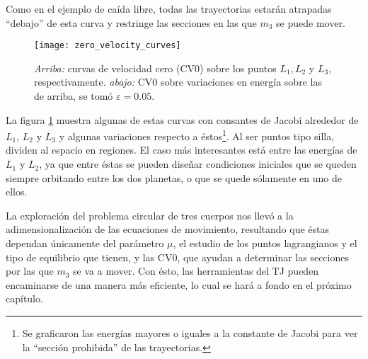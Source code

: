 Como en el ejemplo de caída libre, todas las trayectorias estarán atrapadas ``debajo'' de esta curva y restringe las secciones en las que $m_3$ se puede mover. 

\begin{figure}[h!]
 \centering
 \texttt{[image: zero\_velocity\_curves]}
 \caption{\textit{Arriba:} curvas de velocidad cero (CV0) sobre los puntos $L_1, L_2$ y $L_3$, respectivamente. \textit{abajo:} CV0 sobre variaciones en energía sobre las de arriba, se tomó $\varepsilon = 0.05$.}
 \label{fig:zero_velocity_curves}
\end{figure}

La figura \ref{fig:zero_velocity_curves} muestra algunas de estas curvas con consantes de Jacobi alrededor de $L_1$, $L_2$ y $L_3$ y algunas variaciones respecto a éstos\footnote{Se graficaron las energías mayores o iguales a la constante de Jacobi para ver la ``sección prohibida'' de las trayectorias.}. Al ser puntos tipo silla, dividen al espacio en regiones. El caso más interesantes está entre las energías de $L_1$ y $L_2$, ya que entre éstas se pueden diseñar condiciones iniciales que se queden siempre orbitando entre los dos planetas, o que se quede sólamente en uno de ellos.

La exploración del problema circular de tres cuerpos nos llevó a la adimensionalización de las ecuaciones de movimiento, resultando que éstas dependan únicamente del parámetro $\mu$, el estudio de los puntos lagrangianos y el tipo de equilibrio que tienen, y las CV0, que ayudan a determinar las secciones por las que $m_3$ se va a mover. Con ésto, las herramientas del TJ pueden encaminarse de una manera más eficiente, lo cual se hará a fondo en el próximo capítulo.